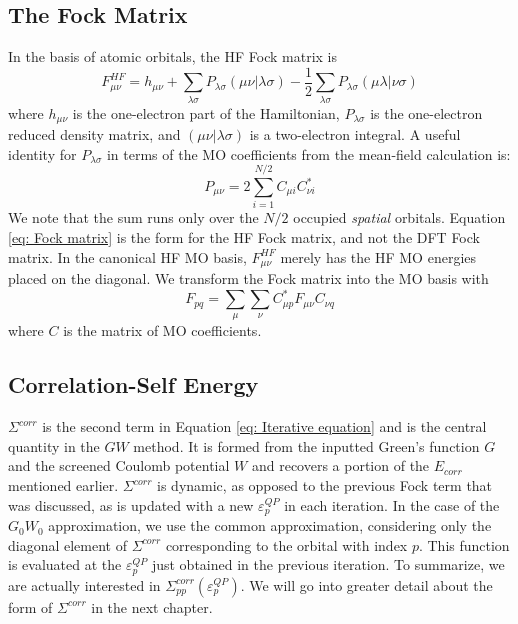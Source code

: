 \documentclass[12pt]{caltech_thesis}
\begin{document}
\subsection{The Fock Matrix}
In the basis of atomic orbitals, the HF Fock matrix is
\begin{equation}
F_{\mu\nu}^{HF} = h_{\mu\nu} + \sum_{\lambda\sigma}P_{\lambda\sigma}(\mu\nu|\lambda\sigma) - \frac{1}{2}\sum_{\lambda\sigma}P_{\lambda\sigma}(\mu\lambda|\nu\sigma)
\label{eq: Fock matrix}
\end{equation}
where $h_{\mu\nu}$ is the one-electron part of the Hamiltonian, $P_{\lambda\sigma}$ is the one-electron reduced density matrix, and $(\mu\nu|\lambda\sigma)$ is a two-electron integral. \autocite{szabo_modern_2012} A useful identity for $P_{\lambda\sigma}$ in terms of the MO coefficients from the mean-field calculation is: 
\begin{equation}
P_{\mu\nu} = 2\sum_{i=1}^{N/2}C_{\mu i}C_{\nu i}^{*}
\end{equation}
We note that the sum runs only over the $N/2$ occupied \emph{spatial} orbitals. Equation \ref{eq: Fock matrix} is the form for the HF Fock matrix, and not the DFT Fock matrix. In the canonical HF MO basis, $F_{\mu\nu}^{HF}$ merely has the HF MO energies placed on the diagonal. We transform the Fock matrix into the MO basis with
\begin{equation}
   F_{pq} = \sum_{\mu} \sum_{\nu} C_{\mu p}^{*}F_{\mu\nu}C_{\nu q}
\end{equation}
where $C$ is the matrix of MO coefficients.
\subsection{Correlation-Self Energy}
$\Sigma^{corr}$ is the second term in Equation \ref{eq: Iterative equation} and is the central quantity in the $GW$ method. It is formed from the inputted Green's function $G$ and the screened Coulomb potential $W$ and recovers a portion of the $E_{corr}$ mentioned earlier. $\Sigma^{corr}$ is dynamic, as opposed to the previous Fock term that was discussed, as is updated with a new $\varepsilon_{p}^{QP}$ in each iteration. In the case of the $G_0W_0$ approximation, we use the common approximation, considering only the diagonal element of $\Sigma^{corr}$ corresponding to the orbital with index $p$. This function is evaluated at the $\varepsilon_{p}^{QP}$ just obtained in the previous iteration. To summarize, we are actually interested in $\Sigma_{pp}^{corr}(\varepsilon_{p}^{QP})$. We will go into greater detail about the form of $\Sigma^{corr}$ in the next chapter.
\end{document}
